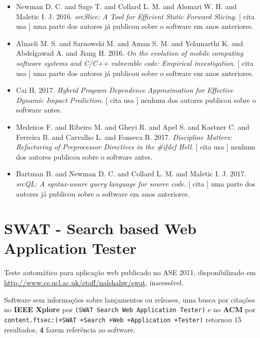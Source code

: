 \begin{itemize}
      [
          cita
          usa
      ]
uma parte dos autores já publicou sobre o software em anos anteriores.
\item Newman D. C. and Sage T. and Collard L. M. and Alomari W. H. and Maletic I. J.
      2016.
        \textit{ srcSlice: A Tool for Efficient Static Forward Slicing}.
      [
          cita
          usa
      ]
uma parte dos autores já publicou sobre o software em anos anteriores.
\item Alnaeli M. S. and Sarnowski M. and Aman S. M. and Yelamarthi K. and Abdelgawad A. and Jiang H.
      2016.
        \textit{ On the evolution of mobile computing software systems and C/C++ vulnerable code: Empirical investigation}.
      [
          cita
          usa
      ]
uma parte dos autores já publicou sobre o software em anos anteriores.
\item Cai H.
      2017.
        \textit{ Hybrid Program Dependence Approximation for Effective Dynamic Impact Prediction}.
      [
          cita
          usa
      ]
nenhum dos autores publicou sobre o software antes.
\item Medeiros F. and Ribeiro M. and Gheyi R. and Apel S. and Kastner C. and Ferreira B. and Carvalho L. and Fonseca B.
      2017.
        \textit{ Discipline Matters: Refactoring of Preprocessor Directives in the \#ifdef Hell}.
      [
          cita
          usa
      ]
nenhum dos autores publicou sobre o software antes.
\item Bartman B. and Newman D. C. and Collard L. M. and Maletic I. J.
      2017.
        \textit{ srcQL: A syntax-aware query language for source code}.
      [
          cita
      ]
uma parte dos autores já publicou sobre o software em anos anteriores.
\end{itemize}
\section{SWAT - Search based Web Application Tester}

Teste automático para aplicação web
publicado no ASE 2011,
disponibilizado em \url{http://www.cs.ucl.ac.uk/staff/nalshahw/swat},
inacessível.

Software sem informações sobre lançamentos ou releases,
uma busca por citações no {\bf IEEE Xplore} por
\texttt{(SWAT Search Web Application Tester)}
e no {\bf ACM} por
\texttt{content.ftsec:(+SWAT +Search +Web +Application +Tester)}
retornou
15 resultados,
{\bf 4} fazem referência ao software.


